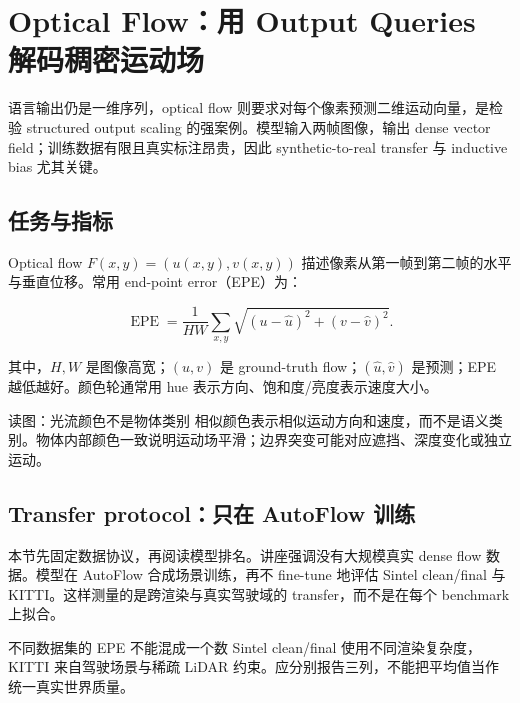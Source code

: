 \section{Optical Flow：用 Output Queries 解码稠密运动场}

语言输出仍是一维序列，optical flow 则要求对每个像素预测二维运动向量，是检验 structured output scaling 的强案例。模型输入两帧图像，输出 dense vector field；训练数据有限且真实标注昂贵，因此 synthetic-to-real transfer 与 inductive bias 尤其关键。

\subsection{任务与指标}

Optical flow $F(x,y)=(u(x,y),v(x,y))$ 描述像素从第一帧到第二帧的水平与垂直位移。常用 end-point error（EPE）为：

\[
\operatorname{EPE}=\frac{1}{HW}\sum_{x,y}\sqrt{(u-\hat u)^2+(v-\hat v)^2}.
\]

其中，$H,W$ 是图像高宽；$(u,v)$ 是 ground-truth flow；$(\hat u,\hat v)$ 是预测；EPE 越低越好。颜色轮通常用 hue 表示方向、饱和度/亮度表示速度大小。


\begin{knowledgebox}{读图：光流颜色不是物体类别}
相似颜色表示相似运动方向和速度，而不是语义类别。物体内部颜色一致说明运动场平滑；边界突变可能对应遮挡、深度变化或独立运动。
\end{knowledgebox}

\subsection{Transfer protocol：只在 AutoFlow 训练}

本节先固定数据协议，再阅读模型排名。讲座强调没有大规模真实 dense flow 数据。模型在 AutoFlow 合成场景训练，再不 fine-tune 地评估 Sintel clean/final 与 KITTI。这样测量的是跨渲染与真实驾驶域的 transfer，而不是在每个 benchmark 上拟合。


\begin{warningbox}{不同数据集的 EPE 不能混成一个数}
Sintel clean/final 使用不同渲染复杂度，KITTI 来自驾驶场景与稀疏 LiDAR 约束。应分别报告三列，不能把平均值当作统一真实世界质量。
\end{warningbox}

